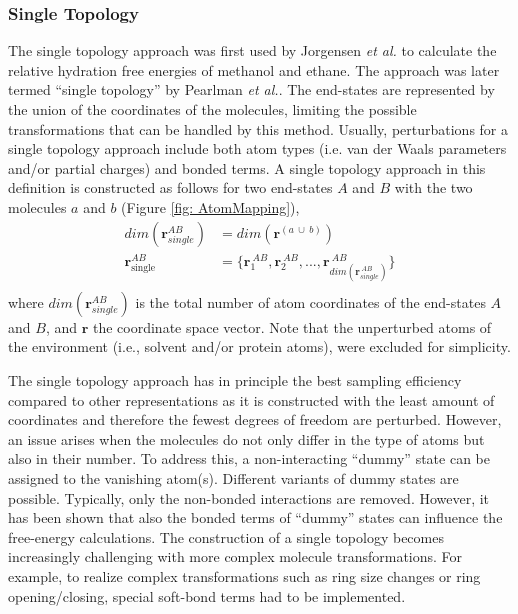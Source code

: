 \subsubsection{Single Topology}
The single topology approach was first used by Jorgensen \textit{et al.}\cite{Jorgensen1985} to calculate the relative hydration free energies of methanol and ethane. The approach was later termed ``single topology'' by Pearlman \textit{et al.}.\cite{Pearlman1991}
The end-states are represented by the union of the coordinates of the molecules, limiting the possible transformations that can be handled by this method. Usually, perturbations for a single topology approach include both atom types (i.e. van der Waals parameters and/or partial charges) and bonded terms.\cite{Jorgensen1985, Pearlman1991, Pearlman1994, Boresch1999, Boresch1999B, Donnini2011, Donnini2016, Wang2015,  Liu2015, Wang2017, Damodaran2001}
%
A single topology approach in this definition is constructed as follows for two end-states $A$ and $B$ with the two molecules $a$ and $b$ (Figure \ref{fig: AtomMapping}),
\begin{align*}
dim(\textbf{r}_{single}^{AB}) &= dim(\textbf{r}^{(a~\cup~b)}) \\
    \textbf{r}^{AB}_{\text{single}} &= \{\textbf{r}^{~AB}_{1}, \textbf{r}^{~AB}_{2}, ..., \textbf{r}^{~AB}_{dim(\textbf{r}_{single}^{~AB})}\}\\
\end{align*}
where $dim(\textbf{r}_{single}^{AB})$ is the total number of atom coordinates of the end-states $A$ and $B$, and $\textbf{r}$ the coordinate space vector. Note that the unperturbed atoms of the environment (i.e., solvent and/or protein atoms), were excluded for simplicity.

The single topology approach has in principle the best sampling efficiency compared to other representations as it is constructed with the least amount of coordinates and therefore the fewest degrees of freedom are perturbed.\cite{Pearlman1994, Donnini2011, Yu2017, Fleck2021}
However, an issue arises when the molecules do not only differ in the type of atoms but also in their number. To address this, a non-interacting ``dummy'' state can be assigned to the vanishing atom(s).\cite{Pearlman1994, Donnini2011, Yu2017, Fleck2021}
Different variants of dummy states are possible. Typically, only the non-bonded interactions are removed. However, it has been shown that also the bonded terms of ``dummy'' states can influence the free-energy calculations.\cite{Fleck2021}
The construction of a single topology becomes increasingly challenging with more complex molecule transformations.
For example, to realize complex transformations such as ring size changes or ring opening/closing, special soft-bond terms had to be implemented.\cite{Wang2017} 

